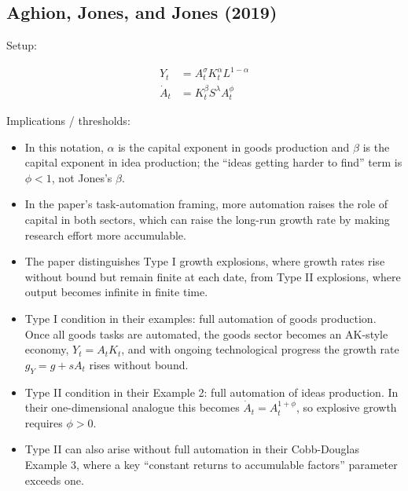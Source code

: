 \documentclass[
  11pt,
  letterpaper,
  DIV=11,
  numbers=noendperiod]{scrartcl}
\providecommand{\tightlist}{%
  \setlength{\itemsep}{0pt}\setlength{\parskip}{0pt}}
\begin{document}
\subsection{Aghion, Jones, and Jones (2019)}\label{aghion2019artificial}

Setup:

\[\begin{aligned}
         Y_t &= A_t^{\sigma} K_t^{\alpha} L^{1-\alpha} \\
         \dot A_t &= K_t^{\beta} S^{\lambda} A_t^{\phi}
      \end{aligned}
\]

Implications / thresholds:

\begin{itemize}
\tightlist
\item
  In this notation, \(\alpha\) is the capital exponent in goods
  production and \(\beta\) is the capital exponent in idea production;
  the ``ideas getting harder to find'' term is \(\phi < 1\), not Jones's
  \(\beta\).
\item
  In the paper's task-automation framing, more automation raises the
  role of capital in both sectors, which can raise the long-run growth
  rate by making research effort more accumulable.
\item
  The paper distinguishes Type I growth explosions, where growth rates
  rise without bound but remain finite at each date, from Type II
  explosions, where output becomes infinite in finite time.
\item
  Type I condition in their examples: full automation of goods
  production. Once all goods tasks are automated, the goods sector
  becomes an AK-style economy, \(Y_t = A_tK_t\), and with ongoing
  technological progress the growth rate \(g_Y = g + sA_t\) rises
  without bound.
\item
  Type II condition in their Example 2: full automation of ideas
  production. In their one-dimensional analogue this becomes
  \(\dot{A}_t = A_t^{1+\phi}\), so explosive growth requires \(\phi>0\).
\item
  Type II can also arise without full automation in their Cobb-Douglas
  Example 3, where a key ``constant returns to accumulable factors''
  parameter exceeds one.
\end{itemize}
\end{document}
